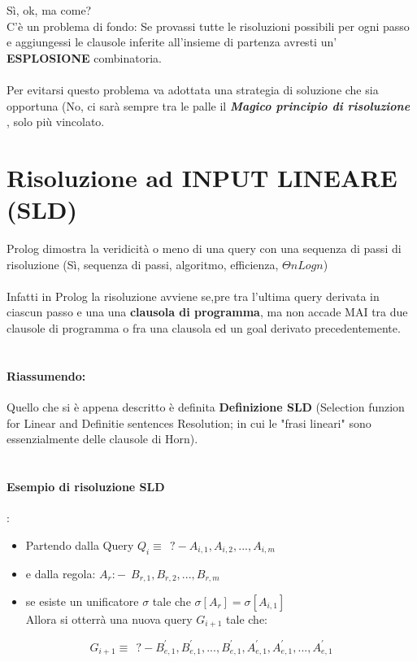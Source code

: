 \documentclass[12pt, a4paper, openany, oneside]{book}
\begin{document}
{Sì, ok, ma come?\\
C'è un problema di fondo: Se provassi tutte le risoluzioni possibili per ogni passo
e aggiungessi le clausole inferite all'insieme di partenza avresti un'\textbf{
ESPLOSIONE 
} combinatoria. \\ \\
Per evitarsi questo problema va adottata una strategia di soluzione che sia 
opportuna (No, ci sarà sempre tra le palle il \color{red} \textbf{\textit{Magico principio di risoluzione
}} \color{black}, solo più vincolato. \\
\section{Risoluzione ad INPUT LINEARE (SLD)}
Prolog dimostra la veridicità o meno di una query con una sequenza di passi di
risoluzione (Sì, sequenza di passi, algoritmo, efficienza, $\Theta nLogn$) 
\\ \\
Infatti in Prolog la risoluzione avviene se,pre tra l'ultima query derivata in 
ciascun passo e una una \textbf{clausola di programma}, ma non accade MAI tra
due clausole di programma o fra una clausola ed un goal derivato precedentemente.
\\ \\
\paragraph{Riassumendo: } Quello che si è appena descritto è definita \textbf{Definizione
SLD} (Selection funzion for Linear and Definitie sentences Resolution; in cui
le "frasi lineari" sono essenzialmente delle clausole di Horn).
\\ \\
\paragraph{Esempio di risoluzione SLD}: \\
\begin{itemize}
	\item Partendo dalla Query $Q_{i} \equiv ~~ ?- A_{i,1}, A_{i,2}, ..., A_{i,m}$
	\item e dalla regola: $A_{r} :- ~~ B_{r,1}, B_{r,2}, ..., B_{r,m}$
	\item se esiste un unificatore $\sigma$ tale che $\sigma[A_{r}] = 
	\sigma[A_{i,1}]$ \\
	Allora si otterrà una nuova query $G_{i+1}$ tale che: 
\end{itemize}
$$G_{i+1} \equiv ~~ ?- B_{e,1}^{'}, B_{e,1}^{'}, ..., B_{e,1}^{'}, A_{e,1}^{'}, 
A_{e,1}^{'}, ..., A_{e,1}^{'} $$

}
\end{document}
